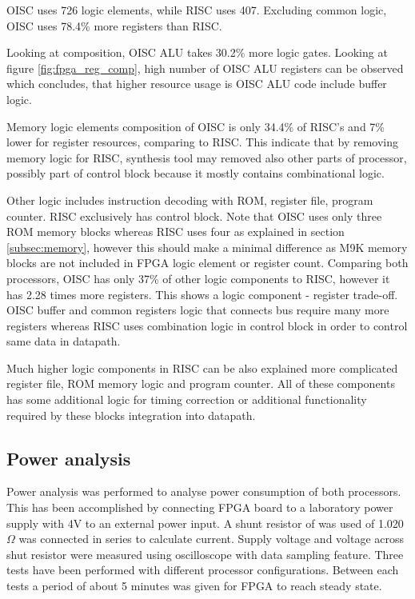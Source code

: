 OISC uses 726 logic elements, while RISC uses 407. Excluding common logic, OISC uses 78.4\% more registers than RISC.

Looking at composition, OISC ALU takes 30.2\% more logic gates. Looking at figure \ref{fig:fpga_reg_comp}, high number of OISC ALU registers can be observed which concludes, that higher resource usage is OISC ALU code include buffer logic.

Memory logic elements composition of OISC is only 34.4\% of RISC's and 7\% lower for register resources, comparing to RISC. This indicate that by removing memory logic for RISC, synthesis tool may removed also other parts of processor, possibly part of control block because it mostly contains combinational logic.

Other logic includes instruction decoding with ROM, register file, program counter. RISC exclusively has control block. Note that OISC uses  only three ROM memory blocks whereas RISC uses four as explained in section \ref{subsec:memory}, however this should make a minimal difference as M9K memory blocks are not included in FPGA logic element or register count. Comparing both processors, OISC has only 37\% of other logic components to RISC, however it has 2.28 times more registers. This shows a logic component - register trade-off. OISC buffer and common registers logic that connects bus require many more registers whereas RISC uses combination logic in control block in order to control same data in datapath. 

Much higher logic components in RISC can be also explained more complicated register file, ROM memory logic and program counter. All of these components has some additional logic for timing correction or additional functionality required by these blocks integration into datapath.

\subsection{Power analysis}

Power analysis was performed to analyse power consumption of both processors.
This has been accomplished by connecting FPGA board to a laboratory power supply with 4V to an external power input. A shunt resistor of was used of 1.020$\Omega$ was connected in series to calculate current. Supply voltage and voltage across shut resistor were measured using oscilloscope with data sampling feature. Three tests have been performed with different processor configurations. Between each tests a period of about 5 minutes was given for FPGA to reach steady state. 


